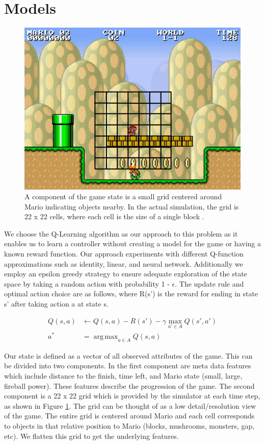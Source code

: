 \documentclass[12pt]{article}
\DeclareMathOperator*{\argmax}{arg\,max}
\begin{document}
\section{Models}

\begin{figure}[h]
\centering
\includegraphics[scale=0.5]{imgs/mario_grid}
\caption{A component of the game state is a small grid centered around Mario indicating objects nearby. In the actual simulation, the grid is 22 x 22 cells, where each cell is the size of a single block \cite{karakovskiy2012mario}.}
\label{mario_grid}
\end{figure}

We choose the Q-Learning algorithm as our approach to this problem as it enables us to learn a controller without creating a model for the game or having a known reward function. Our approach experiments with different Q-function approximations such as identity, linear, and neural network. Additionally we employ an epsilon greedy strategy to ensure adequate exploration of the state space by taking a random action with probability 1 - $\epsilon$. The update rule and optimal action choice are as follows, where R(s') is the reward for ending in state s' after taking action a at state s.

\begin{align*}
Q(s,a) &\leftarrow Q(s,a) - R(s') - \gamma \max_{a' \in A} Q(s',a')\\
a^* &= \argmax_{a \in A} Q(s,a)
\end{align*}

Our state is defined as a vector of all observed attributes of the game. This can be divided into two components. In the first component are meta data features which include distance to the finish, time left, and Mario state (small, large, fireball power). These features describe the progression of the game. The second component is a 22 x 22 grid which is provided by the simulator at each time step, as shown in Figure \ref{mario_grid}. The grid can be thought of as a low detail/resolution view of the game. The entire grid is centered around Mario and each cell corresponds to objects in that relative position to Mario (blocks, mushrooms, monsters, gap, etc). We flatten this grid to get the underlying features.
\end{document}
